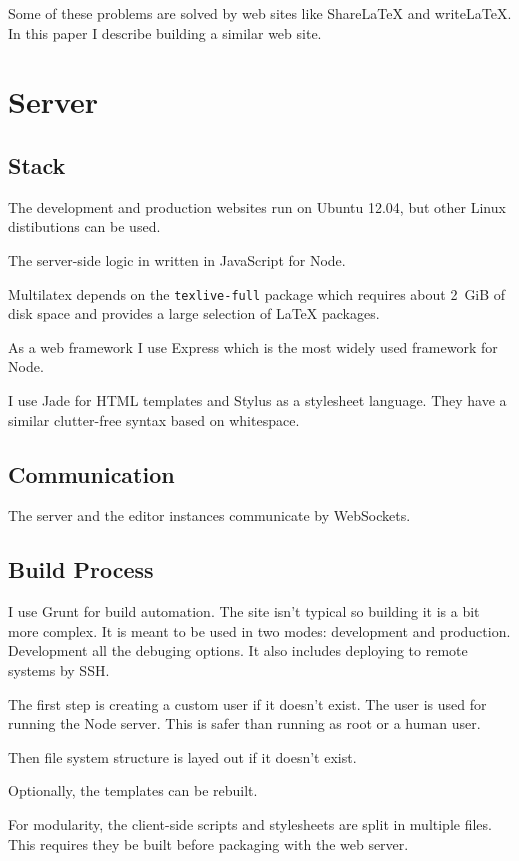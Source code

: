\documentclass{llncs}
\begin{document}
Some of these problems are solved by web sites like \mbox{ShareLaTeX} and \mbox{writeLaTeX}. In this paper I describe building a similar web site.

\section{Server}

\subsection{Stack}

The development and production websites run on Ubuntu 12.04, but other Linux distibutions can be used.

The server-side logic in written in JavaScript for Node.

Multilatex depends on the \texttt{texlive-full} package which requires about 2~GiB of disk space and provides a large selection of \LaTeX{} packages.

As a web framework I use Express which is the most widely used framework for Node.

I use Jade for HTML templates and Stylus as a stylesheet language. They have a similar clutter-free syntax based on whitespace.

\subsection{Communication}

The server and the editor instances communicate by WebSockets.

\subsection {Build Process}

I use Grunt for build automation. The site isn't typical so building it is a bit more complex. It is meant to be used in two modes: development and production. Development all the debuging options. It also includes deploying to remote systems by SSH.

The first step is creating a custom user if it doesn't exist. The user is used for running the Node server. This is safer than running as root or a human user.

Then file system structure is layed out if it doesn't exist.

Optionally, the templates can be rebuilt.

For modularity, the client-side scripts and stylesheets are split in multiple files. This requires they be built before packaging with the web server.
\end{document}
